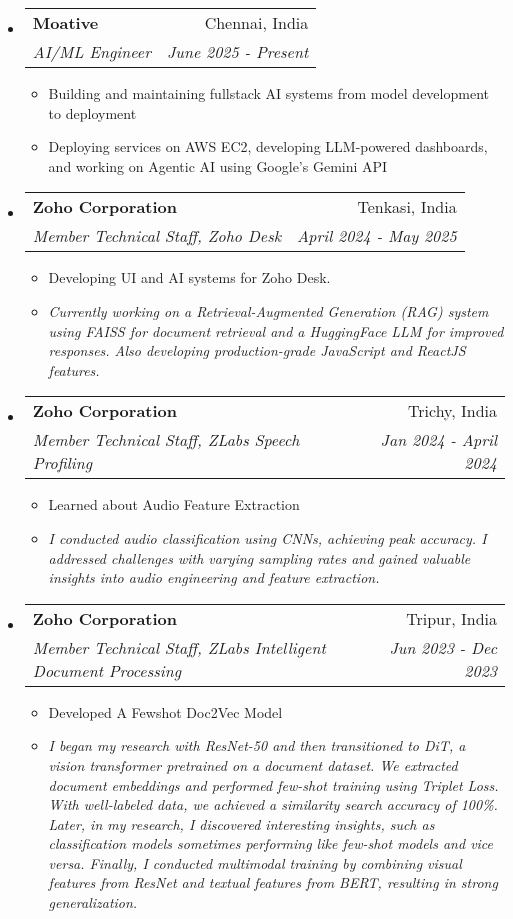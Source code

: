 \documentclass[letterpaper,11pt]{article}
\makeatletter
\newcommand{\resitem}[1]{\item #1 \vspace{-2pt}}
\newcommand{\resheading}[1]{\textbf{\sffamily{\mbox{~}{\large #1} \vphantom{p\^{E}}}}}
\newcommand{\ressubheading}[4]{
\begin{tabular*}{6.5in}{l@{\extracolsep{\fill}}r}
    \textbf{#1} & #2 \\
    \textit{#3} & \textit{#4} \\
\end{tabular*}\vspace{-4pt}} %
\makeatother
\begin{document}
\resheading{Work Experience}
\begin{itemize}
\item[]
    \ressubheading{Moative}{Chennai, India}{AI/ML Engineer}{June 2025 - Present}
    \begin{itemize}
        \resitem{Building and maintaining fullstack AI systems from model development to deployment}
        \resitem{Deploying services on AWS EC2, developing LLM-powered dashboards, and working on Agentic AI using Google's Gemini API}
    \end{itemize}
\item[]
    \ressubheading{Zoho Corporation}{Tenkasi, India}{Member Technical Staff, Zoho Desk}{April 2024 - May 2025}
    \begin{itemize}
        \resitem{Developing UI and AI systems for Zoho Desk.}
        \resitem{\textit{Currently working on a Retrieval-Augmented Generation (RAG) system using FAISS for document retrieval and a HuggingFace LLM for improved responses. Also developing production-grade JavaScript and ReactJS features.}}
    \end{itemize}
\item[]
	\ressubheading{Zoho Corporation}{Trichy, India}{Member Technical Staff, ZLabs Speech Profiling}{Jan 2024 - April 2024}
	\begin{itemize}
		\resitem{Learned about Audio Feature Extraction}
		\resitem{\textit{I conducted audio classification using CNNs, achieving peak accuracy. I addressed challenges with varying sampling rates and gained valuable insights into audio engineering and feature extraction.}}
	\end{itemize}
	
\item[]
	\ressubheading{Zoho Corporation}{Tripur, India}{Member Technical Staff, ZLabs Intelligent Document Processing}{Jun 2023 - Dec 2023}
	\begin{itemize}
		\resitem{Developed A Fewshot Doc2Vec Model}
		\resitem{\textit{I began my research with ResNet-50 and then transitioned to DiT, a vision transformer pretrained on a document dataset. We extracted document embeddings and performed few-shot training using Triplet Loss. With well-labeled data, we achieved a similarity search accuracy of 100\%. Later, in my research, I discovered interesting insights, such as classification models sometimes performing like few-shot models and vice versa. Finally, I conducted multimodal training by combining visual features from ResNet and textual features from BERT, resulting in strong generalization.}}
	\end{itemize}


\end{itemize}
\end{document}

